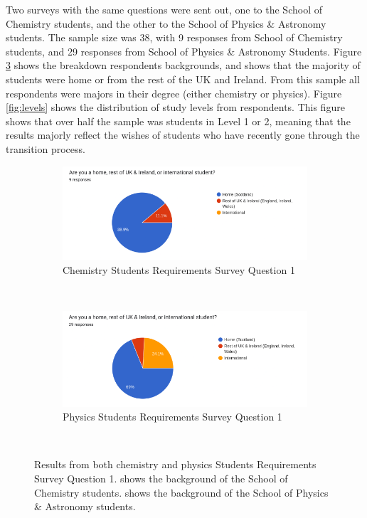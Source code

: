\documentclass{l4proj}
\begin{document}
Two surveys with the same questions were sent out,  one to the School of Chemistry students,  and the other to the School of Physics \& Astronomy students. The sample size was 38,  with 9 responses from School of Chemistry students,  and 29 responses from School of Physics \& Astronomy Students. Figure \ref{fig:background} shows the breakdown respondents backgrounds,  and shows that the majority of students were home or from the rest of the UK and Ireland. From this sample all respondents were majors in their degree (either chemistry or physics). Figure \ref{fig:levels} shows the distribution of study levels from respondents. This figure shows that over half the sample was students in Level 1 or 2,  meaning that the results majorly reflect the wishes of students who have recently gone through the transition process.

\begin{figure}[h]
    \centering
    \begin{subfigure}[b]{0.6\textwidth}
        \includegraphics[width=\textwidth]{images/backgroundChem.pdf}
        \caption{Chemistry Students Requirements Survey Question 1}
        \label{fig:syn1}
    \end{subfigure}
    ~ %
    \begin{subfigure}[b]{0.6\textwidth}
        \includegraphics[width=\textwidth]{images/backgroundPhys.pdf}
        \caption{Physics Students Requirements Survey Question 1}
        \label{fig:syn2}
    \end{subfigure}
    ~ %
    \caption{Results from both chemistry and physics Students Requirements Survey Question 1.  shows the background of the School of Chemistry students.  shows the background of the School of Physics \& Astronomy students.
    }\label{fig:background}
\end{figure}
\end{document}
